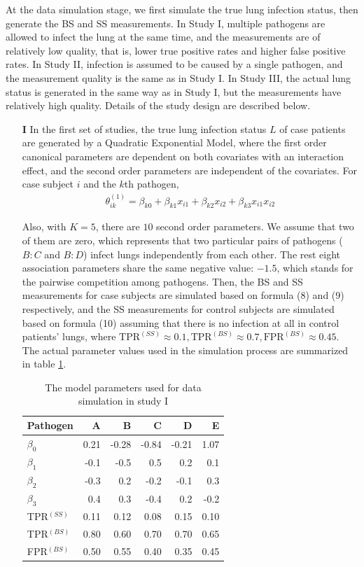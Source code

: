 \documentclass[11 pt, a4paper]{article}  %
\begin{document}
At the data simulation stage, we first simulate the true lung infection status, then generate the BS and SS measurements. In Study I, multiple pathogens are allowed to infect the lung at the same time, and the measurements are of relatively low quality, that is, lower true positive rates and higher false positive rates. In Study II, infection is assumed to be caused by a single pathogen, and the measurement quality is the same as in Study I. In Study III, the actual lung status is generated in the same way as in Study I, but the measurements have relatively high quality. Details of the study design are described below.

\begin{itemize}
\item[{\bf I}]
In the first set of studies, the true lung infection status $L$ of case patients are generated by a Quadratic Exponential Model, where the first order canonical parameters are dependent on both covariates with an interaction effect, and the second order parameters are independent of the covariates. For case subject $i$ and the $k$th pathogen, 
\begin{align*}
\theta^{(1)}_{ik} = \beta_{k0} + \beta_{k1} x_{i1} + \beta_{k2} x_{i2} + \beta_{k3} x_{i1} x_{i2}
\end{align*} 

Also, with $K = 5$, there are $10$ second order parameters. We assume that two of them are zero, which represents that two particular pairs of pathogens ($B:C$ and $B:D$) infect lungs independently from each other. The rest eight association parameters share the same negative value: $-1.5$, which stands for the pairwise competition among pathogens. Then, the BS and SS measurements for case subjects are simulated based on formula (8) and (9) respectively, and the SS measurements for control subjects are simulated based on formula (10) assuming that there is no infection at all in control patients' lungs, where $\text{TPR}^{(SS)} \approx 0.1,  \text{TPR}^{(BS)} \approx 0.7, \text{FPR}^{(BS)} \approx 0.45$. The actual parameter values used in the simulation process are summarized in table \ref{tab:study1}.

\begin{table}[h]
\centering
\caption{The model parameters used for data simulation in study I}
\label{tab:study1}
\begin{tabular}{lrrrrr}
\hline
Pathogen     & A    & B     & C     & D     & E    \\ \hline
$\beta_0$    & 0.21 & -0.28 & -0.84 & -0.21 & 1.07 \\
$\beta_1$    & -0.1 & -0.5  & 0.5   & 0.2   & 0.1  \\
$\beta_2$    & -0.3 & 0.2   & -0.2  & -0.1  & 0.3  \\
$\beta_3$    & 0.4  & 0.3   & -0.4  & 0.2   & -0.2 \\
TPR$^{(SS)}$ & 0.11 & 0.12  & 0.08  & 0.15  & 0.10 \\
TPR$^{(BS)}$ & 0.80 & 0.60  & 0.70  & 0.70  & 0.65 \\
FPR$^{(BS)}$ & 0.50 & 0.55  & 0.40  & 0.35  & 0.45 \\ \hline
\end{tabular}
\end{table}


\end{itemize}
\end{document}

